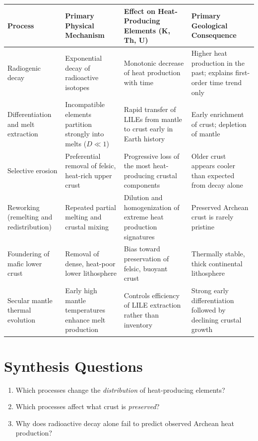 \documentclass[11pt,a4paper]{article}
\begin{document}
\begin{table}[h!]
    \centering
    \begin{tabularx}{\textwidth}{@{}XXXX@{}}
    \toprule
    \textbf{Process} &
    \textbf{Primary Physical Mechanism} &
    \textbf{Effect on Heat-Producing Elements (K, Th, U)} &
    \textbf{Primary Geological Consequence} \\
    \midrule
    Radiogenic decay &
    Exponential decay of radioactive isotopes &
    Monotonic decrease of heat production with time &
    Higher heat production in the past; explains first-order time trend only \\[0.3em]

    Differentiation and melt extraction &
    Incompatible elements partition strongly into melts ($D \ll 1$) &
    Rapid transfer of LILEs from mantle to crust early in Earth history &
    Early enrichment of crust; depletion of mantle \\[0.3em]

    Selective erosion &
    Preferential removal of felsic, heat-rich upper crust &
    Progressive loss of the most heat-producing crustal components &
    Older crust appears cooler than expected from decay alone \\[0.3em]

    Reworking (remelting and redistribution) &
    Repeated partial melting and crustal mixing &
    Dilution and homogenization of extreme heat production signatures &
    Preserved Archean crust is rarely pristine \\[0.3em]

    Foundering of mafic lower crust &
    Removal of dense, heat-poor lower lithosphere &
    Bias toward preservation of felsic, buoyant crust &
    Thermally stable, thick continental lithosphere \\[0.3em]

    Secular mantle thermal evolution &
    Early high mantle temperatures enhance melt production &
    Controls efficiency of LILE extraction rather than inventory &
    Strong early differentiation followed by declining crustal growth \\

    \bottomrule
    \end{tabularx}
\end{table}

\section*{Synthesis Questions}
\begin{enumerate}
  \item Which processes change the \emph{distribution} of heat-producing elements?
  \item Which processes affect what crust is \emph{preserved}?
  \item Why does radioactive decay alone fail to predict observed Archean heat production?
\end{enumerate}
\end{document}
